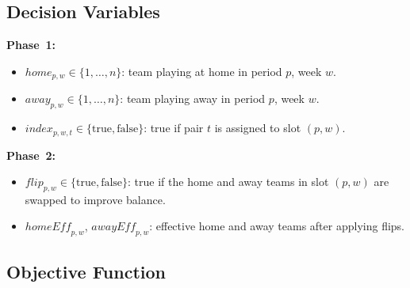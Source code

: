 


\subsection{Decision Variables}

\textbf{Phase~1:}
\begin{itemize}
    \item $\mathit{home}_{p,w} \in \{1,\dots,n\}$: team playing at home in period $p$, week $w$.
    \item $\mathit{away}_{p,w} \in \{1,\dots,n\}$: team playing away in period $p$, week $w$.
    \item $\mathit{index}_{p,w,t} \in \{ \text{true}, \text{false} \}$: true if pair $t$ is assigned to slot $(p,w)$.
\end{itemize}

\textbf{Phase~2:}
\begin{itemize}
    \item $\mathit{flip}_{p,w} \in \{ \text{true}, \text{false} \}$: true if the home and away teams in slot $(p,w)$ are swapped to improve balance.
    \item $\mathit{homeEff}_{p,w}$, $\mathit{awayEff}_{p,w}$: effective home and away teams after applying flips.
\end{itemize}

\subsection{Objective Function}

